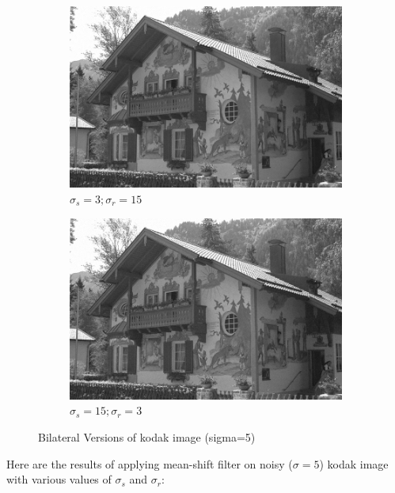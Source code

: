\documentclass[12pt]{article}
\begin{document}
\begin{figure}[h]
\begin{subfigure}[b]{0.24\textwidth}
        \includegraphics[width=\textwidth]{../images/filtered_kodak24_bilateral_sigma_s_3_sigma_r_15.png}
        \caption{$\sigma_s=3;\sigma_r=15$}
        \label{fig:subfig3}
    \end{subfigure}
    \begin{subfigure}[b]{0.24\textwidth}
        \centering
        \includegraphics[width=\textwidth]{../images/filtered_kodak24_bilateral_sigma_s_15_sigma_r_3.png}
        \caption{$\sigma_s=15;\sigma_r=3$}
        \label{fig:subfig3}
    \end{subfigure}
    
    \caption{Bilateral Versions of kodak image (sigma=5)}
    \label{fig:overall}
\end{figure}


Here are the results of applying mean-shift filter on noisy ($\sigma = 5$) kodak image with various values of $\sigma_s$ and $\sigma_r$:
\end{document}
